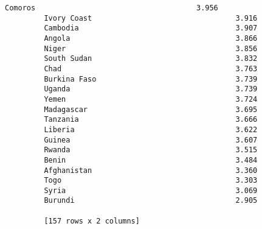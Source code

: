 \documentclass[11pt]{article}
\begin{document}
\begin{Verbatim}[commandchars=\\\{\}]
         Comoros                                     3.956  
         Ivory Coast                                 3.916  
         Cambodia                                    3.907  
         Angola                                      3.866  
         Niger                                       3.856  
         South Sudan                                 3.832  
         Chad                                        3.763  
         Burkina Faso                                3.739  
         Uganda                                      3.739  
         Yemen                                       3.724  
         Madagascar                                  3.695  
         Tanzania                                    3.666  
         Liberia                                     3.622  
         Guinea                                      3.607  
         Rwanda                                      3.515  
         Benin                                       3.484  
         Afghanistan                                 3.360  
         Togo                                        3.303  
         Syria                                       3.069  
         Burundi                                     2.905  
         
         [157 rows x 2 columns]
\end{Verbatim}
            

    
    
    
    
\end{document}
